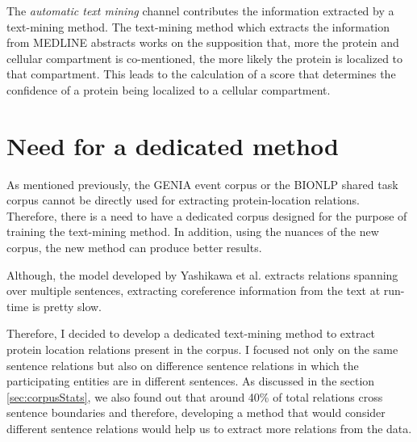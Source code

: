 The \textit{automatic text mining} channel contributes the information extracted by a text-mining method. The text-mining method which extracts the information from MEDLINE abstracts works on the supposition that, more the protein and cellular compartment is co-mentioned, the more likely the protein is localized to that compartment. This leads to the calculation of a score that determines the confidence of a protein being localized to a cellular compartment.

\section{Need for a dedicated method}
%

As mentioned previously, the GENIA event corpus or the BIONLP shared task corpus cannot be directly used for extracting protein-location relations. Therefore, there is a need to have a dedicated corpus designed for the purpose of training the text-mining method. In addition, using the nuances of the new corpus, the new method can produce better results.

Although, the model developed by Yashikawa et al. extracts relations spanning over multiple sentences, extracting coreference information from the text at run-time is pretty slow. 

Therefore, I decided to develop a dedicated text-mining method to extract protein location relations present in the corpus. I focused not only on the same sentence relations but also on difference sentence relations in which the participating entities are in different sentences. As discussed in the section \ref{sec:corpusStats}, we also found out that around 40\% of total relations cross sentence boundaries and therefore, developing a method that would consider different sentence relations would help us to extract more relations from the data.




















